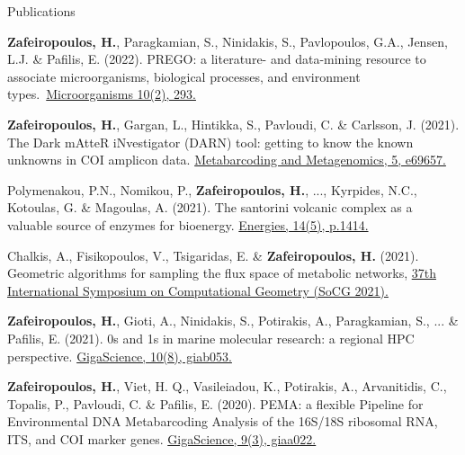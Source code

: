 \documentclass{beamer}
\begin{document}
   \begin{frame}[label=bibliography]{Publications}
      
      \begin{thebibliography}{9}

         \tiny
            \textbf{Zafeiropoulos, H.}, Paragkamian, S., Ninidakis, S., Pavlopoulos, G.A., Jensen, L.J. \& Pafilis, E. (2022). PREGO: a literature- and data-mining resource to associate microorganisms, biological processes, and environment types.~\href{https://www.mdpi.com/1469654}{Microorganisms  10(2), 293.}

         \tiny
            \textbf{Zafeiropoulos, H.}, Gargan, L., Hintikka, S., Pavloudi, C. \& Carlsson, J. (2021). The Dark mAtteR iNvestigator (DARN) tool: getting to know the known unknowns in COI amplicon data. \href{https://mbmg.pensoft.net/article/69657/list/9/}{Metabarcoding and Metagenomics, 5, e69657.}

         \tiny
            Polymenakou, P.N., Nomikou, P., \textbf{Zafeiropoulos, H.}, ..., Kyrpides, N.C., Kotoulas, G. \& Magoulas, A. (2021). 
            The santorini volcanic complex as a valuable source of enzymes for bioenergy. 
            \href{https://doi.org/10.3390/en14051414}{Energies, 14(5), p.1414.}
   
         \tiny
            Chalkis, A., Fisikopoulos, V., Tsigaridas, E. \& \textbf{Zafeiropoulos, H.} (2021). Geometric algorithms for sampling the flux space of metabolic networks, \href{ https://drops.dagstuhl.de/opus/volltexte/2021/13820/}{37th International Symposium on Computational Geometry (SoCG 2021).}

         \tiny
            \textbf{Zafeiropoulos, H.}, Gioti, A., Ninidakis, S., Potirakis, A., Paragkamian, S., ... \& Pafilis, E. (2021). 0s and 1s in marine molecular research: a regional HPC perspective. \href{https://academic.oup.com/gigascience/article/10/8/giab053/6353916}{GigaScience, 10(8), giab053.}

         \tiny
         \textbf{Zafeiropoulos, H.}, Viet, H. Q., Vasileiadou, K., Potirakis, A., Arvanitidis, C., Topalis, P., Pavloudi, C. \& Pafilis, E. (2020). PEMA: a flexible Pipeline for Environmental DNA Metabarcoding Analysis of the 16S/18S ribosomal RNA, ITS, and COI marker genes. \href{https://academic.oup.com/gigascience/article/9/3/giaa022/5803335}{GigaScience, 9(3), giaa022.}


\end{thebibliography}
\end{frame}
\end{document}
